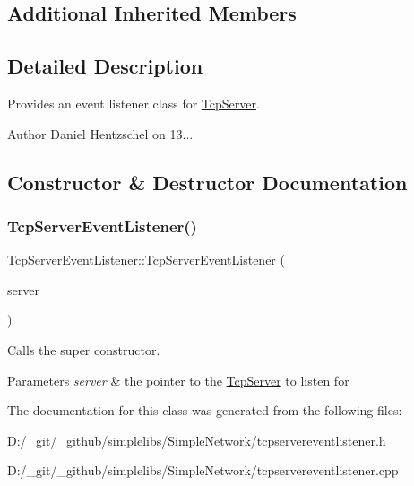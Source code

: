 \subsection*{Additional Inherited Members}


\subsection{Detailed Description}
Provides an event listener class for \mbox{\hyperlink{class_tcp_server}{Tcp\+Server}}. 

\begin{DoxyAuthor}{Author}
Daniel Hentzschel on 13... 
\end{DoxyAuthor}


\subsection{Constructor \& Destructor Documentation}
\mbox{\label{class_tcp_server_event_listener_a07c2697a13038b4b12ded097e4d6aa2b}} 
\subsubsection{\texorpdfstring{TcpServerEventListener()}{TcpServerEventListener()}}
{\footnotesize\ttfamily Tcp\+Server\+Event\+Listener\+::\+Tcp\+Server\+Event\+Listener (\begin{DoxyParamCaption}\item[{\mbox{\hyperlink{class_tcp_server}{Tcp\+Server}} $\ast$}]{server }\end{DoxyParamCaption})\hspace{0.3cm}{\ttfamily [explicit]}}



Calls the super constructor. 


\begin{DoxyParams}{Parameters}
{\em server} & the pointer to the \mbox{\hyperlink{class_tcp_server}{Tcp\+Server}} to listen for \\
\hline
\end{DoxyParams}


The documentation for this class was generated from the following files\+:\begin{DoxyCompactItemize}
\item 
D\+:/\+\_\+git/\+\_\+github/simplelibs/\+Simple\+Network/tcpservereventlistener.\+h\item 
D\+:/\+\_\+git/\+\_\+github/simplelibs/\+Simple\+Network/tcpservereventlistener.\+cpp\end{DoxyCompactItemize}
